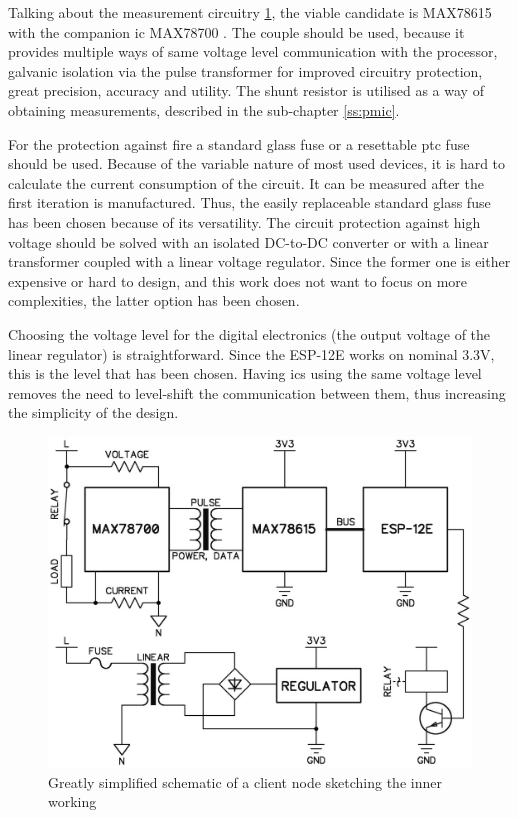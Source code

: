 \documentclass[journal]{IEEEtran}
\begin{document}
Talking about the measurement circuitry \ref{f:schem_block}, the viable candidate is MAX78615 \cite{online:MAX78615} with the companion \gls{ic} MAX78700 \cite{online:MAX78700}. The couple should be used, because it provides multiple ways of same voltage level communication with the processor, galvanic isolation via the pulse transformer for improved circuitry protection, great precision, accuracy and utility. The shunt resistor is utilised as a way of obtaining measurements, described in the sub-chapter \ref{ss:pmic}.

For the protection against fire a standard glass fuse or a resettable \gls{ptc} fuse\cite{wright2004electric} should be used. Because of the variable nature of most used devices, it is hard to calculate the current consumption of the circuit. It can be measured after the first iteration is manufactured. Thus, the easily replaceable standard glass fuse has been chosen because of its versatility. The circuit protection against high voltage should be solved with an isolated DC-to-DC converter\cite{carr1996linear} or with a linear transformer coupled with a linear voltage regulator\cite{2008linear}. Since the former one is either expensive or hard to design, and this work does not want to focus on more complexities, the latter option has been chosen.

Choosing the voltage level for the digital electronics (the output voltage of the linear regulator) is straightforward. Since the ESP-12E works on nominal 3.3V, this is the level that has been chosen. Having \glspl{ic} using the same voltage level removes the need to level-shift the communication between them, thus increasing the simplicity of the design.

\begin{figure}[ht!]
\centering
\includegraphics[width=1\linewidth,angle=0]{schematic_block}
\caption{Greatly simplified schematic of a client node sketching the inner working}\label{f:schem_block}
\end{figure}
\end{document}
